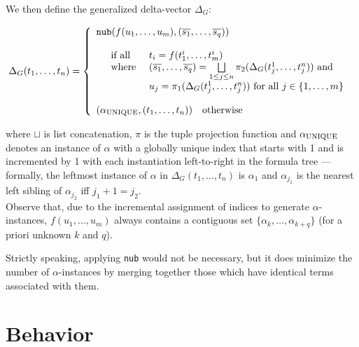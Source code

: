 \documentclass[a4paper, 11pt]{report}
\newcommand{\mt}[1]{\textnormal{#1}}
\begin{document}
\noindent
We then define the generalized delta-vector $\Delta_G$:

$$
  \Delta_G(t_1,\dots,t_n) = \left\{
    \begin{array}{l}
    \texttt{nub}(f(u_1,\dots,u_m), (\overline{s_1},\dots,\overline{s_q})) %
    \\
    \\
    \quad
    \begin{array}{l l}
      \mt{if all } & t_i = f(t_1^i,\dots,t_m^i)\\
      \mt{where } & (\overline{s_1},\dots,\overline{s_q}) = \bigsqcup\limits_{1 \leq j \leq n} \pi_2(\Delta_G(t_j^1,\dots,t_j^n)) \mt{ and}\\
                  & u_j = \pi_1(\Delta_G(t_j^1,\dots,t_j^n)) \mt{ for all } j \in \{1,\dots,m \}\\

    \end{array}
    
    \\
    \\
    
    (\alpha_{\mt{UNIQUE}},(t_1,\dots,t_n))\quad \mt{otherwise}\\
    \end{array}
  \right.
$$

\noindent
where $\sqcup$ is list concatenation, $\pi$ is the tuple projection function and $\alpha_{\mt{UNIQUE}}$ denotes an instance of $\alpha$ with a globally unique index that starts with 1 and is incremented by 1 with each instantiation left-to-right in the formula tree --- formally, the leftmost instance of $\alpha$ in $\Delta_G(t_1,\dots,t_n)$ is $\alpha_1$ and $\alpha_{j_1}$ is the nearest left sibling of $\alpha_{j_2}$ iff $j_1+1=j_2$.\\

Observe that, due to the incremental assignment of indices to generate $\alpha$-instances, $f(u_1,\dots,u_m)$ always contains a contiguous set $\{\alpha_k,\dots,\alpha_{k+q}\}$ (for a priori unknown $k$ and $q$).

Strictly speaking, applying \texttt{nub} would not be necessary, but it does minimize the number of $\alpha$-instances by merging together those which have identical terms associated with them.

\section{Behavior}
\end{document}
